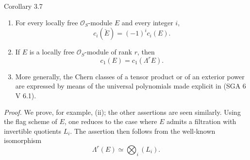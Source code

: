 \begin{statement}{Corollary 3.7}
\begin{enumerate}[label=(\roman*)]
\item For every locally free $\mathcal O_S$-module $E$ and every integer $i$,
\[
c_i(\check E)=(-1)^i c_i(E).
\]
\item If $E$ is a locally free $\mathcal O_S$-module of rank $r$, then
\[
c_1(E)=c_1(\Lambda^rE).
\]
\item More generally, the Chern classes of a tensor product or of an exterior power are expressed by means of the universal polynomials made explicit in (SGA 6 V 6.1).
\end{enumerate}
\end{statement}

\emph{Proof.} We prove, for example, (ii); the other assertions are seen similarly. Using the flag scheme of $E$, one reduces to the case where $E$ admits a filtration with invertible quotients $L_i$. The assertion then follows from the well-known isomorphism
\[
\Lambda^r(E)\simeq\bigotimes_i (L_i).
\]

